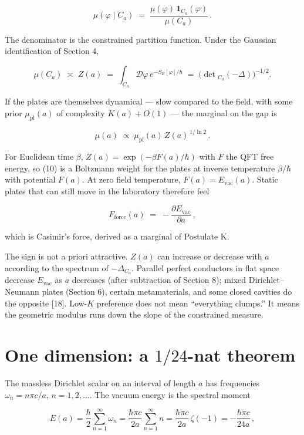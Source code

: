 \documentclass[11pt,letterpaper]{article}
\begin{document}
\[
\mu(\varphi\mid C_a)\;=\;\frac{\mu(\varphi)\,\mathbf{1}_{C_a}(\varphi)}{\mu(C_a)}\,.
\tag{8}
\]


The denominator is the constrained partition function. Under the Gaussian identification of Section 4,


\[
\mu(C_a)\;\asymp\;Z(a)\;=\;\int_{C_a}\mathcal{D}\varphi\,e^{-S_E[\varphi]/\hbar}\;=\;\bigl(\det{}_{C_a}(-\Delta)\bigr)^{-1/2}.
\tag{9}
\]


If the plates are themselves dynamical — slow compared to the field, with some prior \(\mu_{\mathrm{pl}}(a)\) of complexity \(K(a)+O(1)\) — the marginal on the gap is


\[
\mu(a)\;\propto\;\mu_{\mathrm{pl}}(a)\,Z(a)^{\,1/\ln 2}\,.
\tag{10}
\]


For Euclidean time \(\beta\), \(Z(a)=\exp(-\beta F(a)/\hbar)\) with \(F\) the QFT free energy, so (10) is a Boltzmann weight for the plates at inverse temperature \(\beta/\hbar\) with potential \(F(a)\). At zero field temperature, \(F(a)=E_{\mathrm{vac}}(a)\). Static plates that can still move in the laboratory therefore feel


\[
F_{\mathrm{force}}(a)\;=\;-\frac{\partial E_{\mathrm{vac}}}{\partial a}\,,
\tag{11}
\]


which is Casimir’s force, derived as a marginal of Postulate K.


The sign is not a priori attractive. \(Z(a)\) can increase or decrease with \(a\) according to the spectrum of \(-\Delta_{C_a}\). Parallel perfect conductors in flat space decrease \(E_{\mathrm{vac}}\) as \(a\) decreases (after subtraction of Section 8); mixed Dirichlet–Neumann plates (Section 6), certain metamaterials, and some closed cavities do the opposite [18]. Low-\(K\) preference does not mean “everything clumps.” It means the geometric modulus runs down the slope of the constrained measure.



\section{\texorpdfstring{One dimension: a \(1/24\)-nat theorem}{One dimension: a 1/24-nat theorem}}


The massless Dirichlet scalar on an interval of length \(a\) has frequencies \(\omega_n=n\pi c/a\), \(n=1,2,\ldots\). The vacuum energy is the spectral moment


\[
E(a)=\frac{\hbar}{2}\sum_{n=1}^{\infty}\omega_n
=\frac{\hbar\pi c}{2a}\sum_{n=1}^{\infty}n
=\frac{\hbar\pi c}{2a}\,\zeta(-1)
=-\frac{\hbar\pi c}{24a}\,,
\tag{12}
\]
\end{document}
